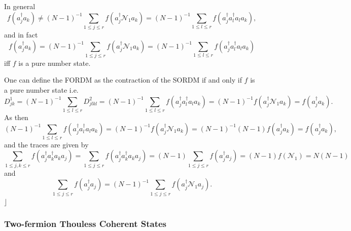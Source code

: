 \documentclass[aps,preprint]{revtex4}%
\begin{document}
In general
\begin{equation}
f\left(  a_{j}^{\dagger}a_{k}\right)  \neq\left(  N-1\right)  ^{-1}\sum_{1\leq
j\leq r}f\left(  a_{j}^{\dagger}\mathcal{N}_{1}a_{k}\right)  =\left(
N-1\right)  ^{-1}\sum_{1\leq l\leq r}f\left(  a_{j}^{\dagger}a_{l}^{\dagger
}a_{l}a_{k}\right)  ,
\end{equation}
and in fact%
\begin{equation}
f\left(  a_{j}^{\dagger}a_{k}\right)  =\left(  N-1\right)  ^{-1}\sum_{1\leq
j\leq r}f\left(  a_{j}^{\dagger}\mathcal{N}_{1}a_{k}\right)  =\left(
N-1\right)  ^{-1}\sum_{1\leq l\leq r}f\left(  a_{j}^{\dagger}a_{l}^{\dagger
}a_{l}a_{k}\right)
\end{equation}
iff $f$ is a pure number state.

One can define the FORDM as the contraction of the SORDM if and only if $f$ is
a pure number state i.e.
\begin{equation}
D_{jk}^{1}=\left(  N-1\right)  ^{-1}\sum_{1\leq l\leq r}D_{jlkl}^{2}=\left(
N-1\right)  ^{-1}\sum_{1\leq l\leq r}f\left(  a_{j}^{\dagger}a_{l}^{\dagger
}a_{l}a_{k}\right)  =\left(  N-1\right)  ^{-1}f\left(  a_{j}^{\dagger
}\mathcal{N}_{1}a_{k}\right)  =f\left(  a_{j}^{\dagger}a_{k}\right)  .
\end{equation}
As then
\begin{equation}
\left(  N-1\right)  ^{-1}\sum_{1\leq l\leq r}f\left(  a_{j}^{\dagger}%
a_{l}^{\dagger}a_{l}a_{k}\right)  =\left(  N-1\right)  ^{-1}f\left(
a_{j}^{\dagger}\mathcal{N}_{1}a_{k}\right)  =\left(  N-1\right)  ^{-1}\left(
N-1\right)  f\left(  a_{j}^{\dagger}a_{k}\right)  =f\left(  a_{j}^{\dagger
}a_{k}\right)  ,
\end{equation}
and the traces are given by
\begin{equation}
\sum_{1\leq j,k\leq r}f\left(  a_{j}^{\dagger}a_{k}^{\dagger}a_{k}%
a_{j}\right)  =\sum_{1\leq j\leq r}f\left(  a_{j}^{\dagger}a_{k}^{\dagger
}a_{k}a_{j}\right)  =\left(  N-1\right)  \sum_{1\leq j\leq r}f\left(
a_{j}^{\dagger}a_{j}\right)  =\left(  N-1\right)  f\left(  \mathcal{N}%
_{1}\right)  =N\left(  N-1\right)
\end{equation}
and
\begin{equation}
\sum_{1\leq j\leq r}f\left(  a_{j}^{\dagger}a_{j}\right)  =\left(  N-1\right)
^{-1}\sum_{1\leq j\leq r}f\left(  a_{j}^{\dagger}\mathcal{N}_{1}a_{j}\right)
.
\end{equation}
$\rfloor$

\subsubsection{Two-fermion Thouless Coherent States}
\end{document}

